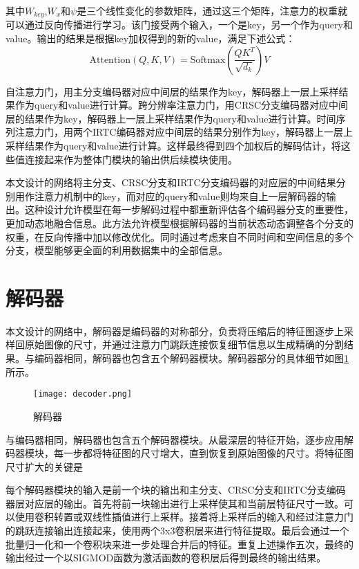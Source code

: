 其中\(W_{key}\),\(W_x\)和\(\psi\)是三个线性变化的参数矩阵，通过这三个矩阵，注意力的权重就可以通过反向传播进行学习。该门接受两个输入，一个是key，另一个作为query和value。输出的结果是根据key加权得到的新的value，满足下述公式：
\begin{equation}
\text{Attention}(Q, K, V) = \text{Softmax}\left(\frac{QK^T}{\sqrt{d_k}}\right)V 
\end{equation}

自注意力门，用主分支编码器对应中间层的结果作为key，解码器上一层上采样结果作为query和value进行计算。跨分辨率注意力门，用CRSC分支编码器对应中间层的结果作为key，解码器上一层上采样结果作为query和value进行计算。时间序列注意力门，用两个IRTC编码器对应中间层的结果分别作为key，解码器上一层上采样结果作为query和value进行计算。这样最终得到四个加权后的解码估计，将这些值连接起来作为整体门模块的输出供后续模块使用。

本文设计的网络将主分支、CRSC分支和IRTC分支编码器的对应层的中间结果分别用作注意力机制中的key，而对应的query和value则均来自上一层解码器的输出。这种设计允许模型在每一步解码过程中都重新评估各个编码器分支的重要性，更加动态地融合信息。此方法允许模型根据解码器的当前状态动态调整各个分支的权重，在反向传播中加以修改优化。同时通过考虑来自不同时间和空间信息的多个分支，模型能够更全面的利用数据集中的全部信息。

\section{解码器}
本文设计的网络中，解码器是编码器的对称部分，负责将压缩后的特征图逐步上采样回原始图像的尺寸，并通过注意力门跳跃连接恢复细节信息以生成精确的分割结果。与编码器相同，解码器也包含五个解码器模块。解码器部分的具体细节如图\ref{fig:decoder}所示。
\begin{figure}[h]
    \centering
    \texttt{[image: decoder.png]}
    \caption{解码器}
    \label{fig:decoder}
  \end{figure}

与编码器相同，解码器也包含五个解码器模块。从最深层的特征开始，逐步应用解码器模块，每一步都将特征图的尺寸增大，直到恢复到原始图像的尺寸。将特征图尺寸扩大的关键是

每个解码器模块的输入是前一个块的输出和主分支、CRSC分支和IRTC分支编码器层对应层的输出。首先将前一块输出进行上采样使其和当前层特征尺寸一致。可以使用卷积转置或双线性插值进行上采样。接着将上采样后的输入和经过注意力门的跳跃连接输出连接起来，使用两个3x3卷积层来进行特征提取。最后会通过一个批量归一化和一个卷积块来进一步处理合并后的特征。重复上述操作五次，最终的输出经过一个以SIGMOD函数为激活函数的卷积层后得到最终的输出结果。

